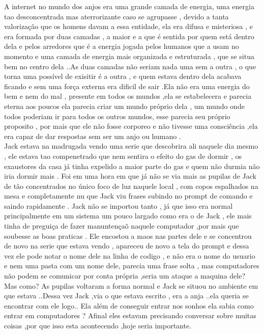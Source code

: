 \documentclass{book}
\begin{document}
A internet no mundo dos anjos era uma grande camada de energia, uma energia tao desconcentrada mas aterrorizante caso se agrupasse , devido a tanta valorização que os homens davam a essa entidade, ela era difusa e misteriosa , e era formada por duas camadas , a maior e a que é sentida por quem está dentro dela e pelos arredores que é a energia jogada pelos humanos que a usam no momento e uma camada de energia mais organizada e estruturada , que se situa bem no centro dela ..As duas camadas não seriam nada uma sem a outra , o que torna uma possível de exisitir é a outra , e quem estava dentro dela acabava ficando e sem uma força externa era dificil de sair .Ela não era uma energia do bem e nem do mal , presente em todos os mundos ,ela se estabelecera e parecia eterna aos poucos ela parecia criar um mundo próprio dela , um mundo onde todos poderiam ir para todos os outros mundos, esse parecia seu próprio proposito , por mais que ele não fosse corporeo e não tivesse uma consciência ,ela era capaz de dar respostas sem ser um anjo ou humano .\\
Jack estava na madrugada vendo uma serie que descobrira ali naquele dia mesmo , ele estava tao compenetrado que nem sentira o efeito do gas de dormir , os exaustores da casa já tinha expelido a maior parte do gas e quem não durmia não iria dormir mais . Foi em uma hora em que já não se via mais as pupilas de Jack de tão concentrados no único foco de luz naquele local , com copos espalhados na mesa e completamente nu que Jack viu frases subindo no prompt de comando e saindo rapidamente . Jack não se importou tanto , já que isso era normal principalmente em um sistema um pouco largado como era o de Jack , ele mais tinha de preguiça de fazer manuntençaõ naquele computador ,por mais que soubesse as boas praticas . Ele encostou a maos nas partes dele e se concentrou de novo na serie que estava vendo , apareceu de novo a tela do prompt e dessa vez ele pode notar o nome dele na linha de codigo , e não era o nome do usuario e nem uma pasta com um nome dele, parecia uma frase solta , mas computadores não podem se comunicar por conta própria ,seria um ataque a maquina dele? Mas como? As pupilas voltaram a forma normal e Jack se situou no ambiente em que estava ..Dessa vez Jack ,via o que estava escrito , era a anja ..ela queria se encontrar com ele logo.. Ela além de conseguir entrar nos sonhos ela sabia como entrar em computadores ? Afinal eles estavam precisando conversar sobre muitas coisas ,por que isso esta acontecendo ,hoje seria importante.\\
\end{document}
